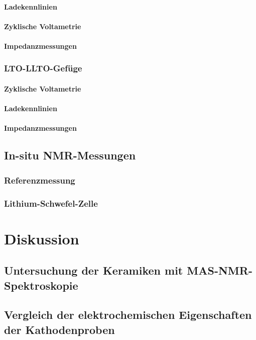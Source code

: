 \documentclass[a4paper, 11pt, headsepline,footsepline,twoside,abstract]{scrbook}
\begin{document}
\subsubsection{Ladekennlinien}
\subsubsection{Zyklische Voltametrie}
\subsubsection{Impedanzmessungen}
\newpage
\subsection{LTO-LLTO-Gefüge}
\subsubsection{Zyklische Voltametrie}
\subsubsection{Ladekennlinien}
\subsubsection{Impedanzmessungen}
\newpage
\section{In-situ NMR-Messungen}
\subsection{Referenzmessung}
\subsection{Lithium-Schwefel-Zelle}
\chapter{Diskussion}
\section{Untersuchung der Keramiken mit MAS-NMR-Spektroskopie}

\section{Vergleich der elektrochemischen Eigenschaften der Kathodenproben}
\end{document}
